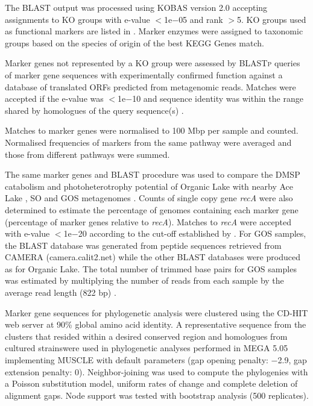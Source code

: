 The \ac{BLAST} output was processed using \ac{KOBAS} version 2.0 \cite{Xie2011} accepting assignments to \ac{KO} groups with e-value $<$1e$-$05 and rank $>$5. 
\ac{KO} groups used as functional markers are listed in . 
Marker enzymes were assigned to taxonomic groups based on the species of origin of the best \ac{KEGG} Genes match. 


Marker genes not represented by a \ac{KO} group were assessed by \textsc{BLASTp} queries of marker gene sequences with experimentally confirmed function  against a database of translated \acp{ORF} predicted from metagenomic reads. 
Matches were accepted if the e-value was $<$1e$-$10 and sequence identity was within the range shared by homologues of the query sequence(s) .

Matches to marker genes were normalised to 100 Mbp per sample and counted. 
Normalised frequencies of markers from the same pathway were averaged and those from different pathways were summed. 

The same marker genes and \ac{BLAST} procedure was used to compare the \ac{DMSP} catabolism and photoheterotrophy potential of Organic Lake with nearby Ace Lake \cite{Lauro2011}, \ac{SO} \cite{Wilkins2012b} and \ac{GOS} metagenomes \cite{Rusch2007}. 
Counts of single copy gene \emph{recA} were also determined to estimate the percentage of genomes containing each marker gene (percentage of marker genes relative to \emph{recA}). 
Matches to \emph{recA} were accepted with e-value $<$1e$-$20 according to the cut-off established by \citet{Howard2008}. 
For \ac{GOS} samples, the \ac{BLAST} database was generated from peptide sequences retrieved from \ac{CAMERA} (camera.calit2.net) while the other \ac{BLAST} databases were produced as for Organic Lake. 
The total number of trimmed base pairs for \ac{GOS} samples was estimated by multiplying the number of reads from each sample by the average read length (822 bp) \cite{Rusch2007}. 

Marker gene sequences for phylogenetic analysis were clustered using the \textsc{CD-HIT} web server \cite{Huang2010} at 90\% global amino acid identity. 
A representative sequence from the clusters that resided within a desired conserved region and homologues from cultured strainswere used in phylogenetic analyses performed in \ac{MEGA} 5.05 \cite{Tamura2011} implementing \textsc{MUSCLE} with default parameters (gap opening penalty: $-$2.9, gap extension penalty: 0). 
Neighbor-joining was used to compute the phylogenies with a Poisson substitution model, uniform rates of change and complete deletion of alignment gaps. 
Node support was tested with bootstrap analysis (500 replicates). 

